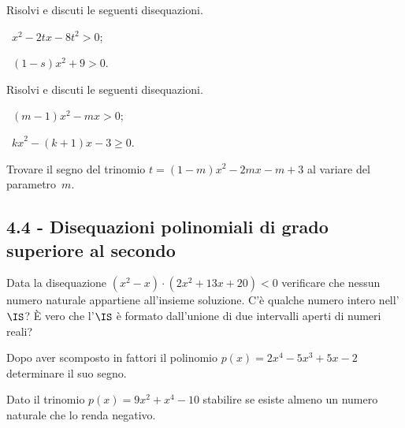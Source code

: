 \begin{esercizio}[\Ast]
 \label{ese:4.29}
Risolvi e discuti le seguenti disequazioni.
\begin{multicols}{2}
 \begin{enumeratea}
 \item~$x^2-2{tx}-8t^2>0$;
 \item~$(1-s)x^2+9>0$.
 \end{enumeratea}
 \end{multicols}
\end{esercizio}

\begin{esercizio}[\Ast]
 \label{ese:4.30}
Risolvi e discuti le seguenti disequazioni.
\begin{multicols}{2}
 \begin{enumeratea}
 \item~$(m-1)x^2-{mx}>0$;
 \item~${kx}^2-(k+1)x-3\ge 0$.
 \end{enumeratea}
 \end{multicols}
\end{esercizio}

\begin{esercizio}
 \label{ese:4.31}
Trovare il segno del trinomio $t=(1-m)x^2-2{mx}-m+3$ al variare del parametro~$ m $.
\end{esercizio}

\subsection*{4.4 - Disequazioni polinomiali di grado superiore al secondo}



\begin{esercizio}
 \label{ese:4.32}
Data la disequazione $\left(x^2-x\right)\cdot \left(2x^2+13x+20\right)<0$ verificare che nessun numero naturale appartiene all’insieme soluzione. C’è qualche numero intero nell’$ \IS $? È vero che l’$ \IS $ è formato dall’unione di due intervalli aperti di numeri reali?
\end{esercizio}

\begin{esercizio}
 \label{ese:4.33}
Dopo aver scomposto in fattori il polinomio $p(x)=2x^4-5x^3+5x-2$ determinare il suo segno.
\end{esercizio}

\begin{esercizio}
 \label{ese:4.34}
Dato il trinomio $p(x)=9x^2+x^4-10$ stabilire se esiste almeno un numero naturale che lo renda negativo.
\end{esercizio}

